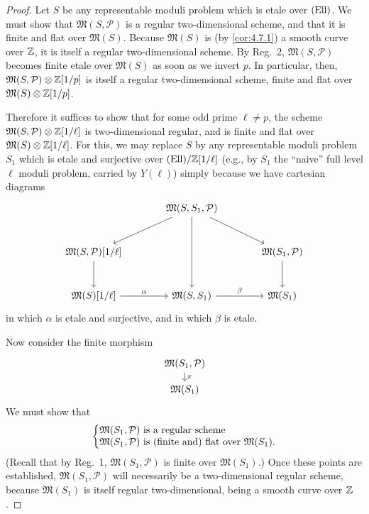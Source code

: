 \begin{proof}
Let $S$ be any representable moduli problem which is etale over $(\mathrm{Ell})$. We must show that $\mathfrak{M}(S, \mathcal{P})$ is a regular two-dimensional scheme, and that it is finite and flat over $\mathfrak{M}(S)$. Because $\mathfrak{M}(S)$ is (by \ref{cor:4.7.1}) a smooth curve over $\mathbb{Z}$, it is itself a regular two-dimensional scheme. By Reg.~2, $\mathfrak{M}(S, \mathcal{P})$ becomes finite etale over $\mathfrak{M}(S)$ as soon as we invert $p$. In particular, then, $\mathfrak{M}(S, \mathcal{P})\otimes\mathbb{Z}[1/p]$ is itself a regular two-dimensional scheme, finite and flat over $\mathfrak{M}(S)\otimes\mathbb{Z}[1/p]$.

Therefore it suffices to show that for some odd prime $\ell \ne p$, the scheme $\mathfrak{M}(S, \mathcal{P})\otimes\mathbb{Z}[1/\ell]$ is two-dimensional regular, and is finite and flat over $\mathfrak{M}(S)\otimes\mathbb{Z}[1/\ell]$. For this, we may replace $S$ by any representable moduli problem $S_1$ which is etale and surjective over $(\mathrm{Ell})/\mathbb{Z}[1/\ell]$ (e.g., by $S_1$ the ``naive'' full level $\ell$ moduli problem, carried by $Y(\ell)$) simply because we have cartesian diagrams
\[
\begin{tikzcd}[row sep=large, column sep=large]
& \mathfrak{M}(S, S_1, \mathcal{P}) \arrow[dl] \arrow[dd] \arrow[dr] & \\
\mathfrak{M}(S, \mathcal{P})[1/\ell] \arrow[d] & & \mathfrak{M}(S_1, \mathcal{P}) \arrow[d] \\
\mathfrak{M}(S)[1/\ell] \arrow[r, "\alpha"] & \mathfrak{M}(S, S_1) \arrow[r, "\beta"] & \mathfrak{M}(S_1)
\end{tikzcd}
\]
in which $\alpha$ is etale and surjective, and in which $\beta$ is etale.

Now consider the finite morphism
\[
\begin{tikzcd}[row sep=small]
\mathfrak{M}(S_1, \mathcal{P}) \arrow[d, "\pi"] \\
\mathfrak{M}(S_1)
\end{tikzcd}
\]
We must show that
\[
\left\{
\begin{array}{@{}l@{}}
\mathfrak{M}(S_1, \mathcal{P}) \text{ is a regular scheme} \\
\mathfrak{M}(S_1, \mathcal{P}) \text{ is (finite and) flat over } \mathfrak{M}(S_1).
\end{array}
\right.
\]
(Recall that by Reg.~1, $\mathfrak{M}(S_1, \mathcal{P})$ is finite over $\mathfrak{M}(S_1)$.) Once these points are established, $\mathfrak{M}(S_1, \mathcal{P})$ will necessarily be a two-dimensional regular scheme, because $\mathfrak{M}(S_1)$ is itself regular two-dimensional, being a smooth curve over $\mathbb{Z}$.


\end{proof}
